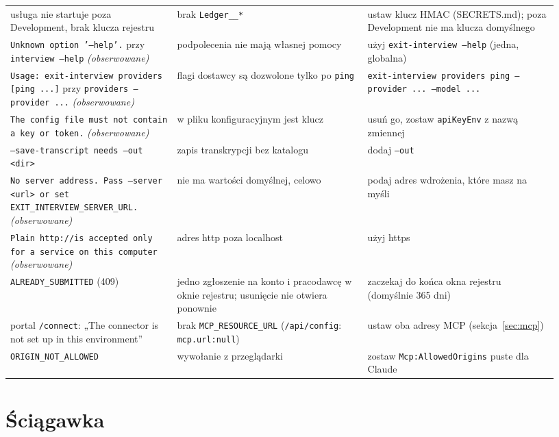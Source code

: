 {\begin{center}
\begin{longtable}{@{}>{\raggedright\arraybackslash}p{0.29\linewidth}>{\raggedright\arraybackslash}p{0.32\linewidth}>{\raggedright\arraybackslash}p{0.32\linewidth}@{}}
usługa nie startuje poza Development, brak klucza rejestru & brak \texttt{Ledger\_\_*} & ustaw klucz HMAC (SECRETS.md); poza Development nie ma klucza domyślnego \\
\texttt{Unknown option '--help'.} przy \texttt{interview --help} \emph{(obserwowane)} & podpolecenia nie mają własnej pomocy & użyj \texttt{exit-\allowbreak{}interview --help} (jedna, globalna) \\
\texttt{Usage: exit-\allowbreak{}interview providers [ping ...]} przy \texttt{providers --provider ...} \emph{(obserwowane)} & flagi dostawcy są dozwolone tylko po \texttt{ping} & \texttt{exit-\allowbreak{}interview providers ping --provider ... --model ...} \\
\texttt{The config file must not contain a key or token.} \emph{(obserwowane)} & w pliku konfiguracyjnym jest klucz & usuń go, zostaw \texttt{apiKeyEnv} z nazwą zmiennej \\
\texttt{--save-\allowbreak{}transcript needs --out <dir>} & zapis transkrypcji bez katalogu & dodaj \texttt{--out} \\
\texttt{No server address. Pass --server <url> or set EXIT\_\allowbreak{}INTERVIEW\_\allowbreak{}SERVER\_\allowbreak{}URL.} \emph{(obserwowane)} & nie ma wartości domyślnej, celowo & podaj adres wdrożenia, które masz na myśli \\
\texttt{Plain http:\allowbreak{}/\allowbreak{}/\allowbreak{}is accepted only for a service on this computer} \emph{(obserwowane)} & adres http poza localhost & użyj https \\
\texttt{ALREADY\_\allowbreak{}SUBMITTED} (409) & jedno zgłoszenie na konto i pracodawcę w oknie rejestru; usunięcie nie otwiera ponownie & zaczekaj do końca okna rejestru (domyślnie 365 dni) \\
portal \texttt{/connect}: „The connector is not set up in this environment” & brak \texttt{MCP\_\allowbreak{}RESOURCE\_\allowbreak{}URL} (\texttt{/api/config}: \texttt{mcp.url:null}) & ustaw oba adresy MCP (sekcja~\ref{sec:mcp}) \\
403 \texttt{ORIGIN\_\allowbreak{}NOT\_\allowbreak{}ALLOWED} & wywołanie z przeglądarki & zostaw \texttt{Mcp:\allowbreak{}AllowedOrigins} puste dla Claude \\
\bottomrule
\end{longtable}
\end{center}

\section{Ściągawka}

}
